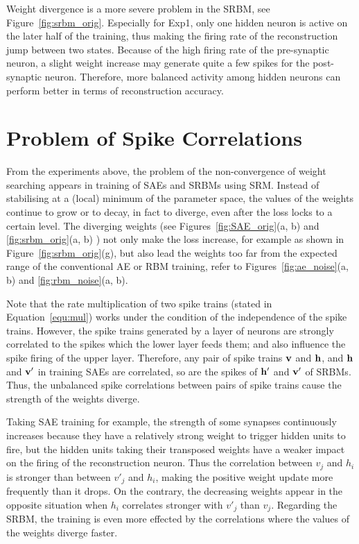 Weight divergence is a more severe problem in the SRBM, see Figure~\ref{fig:srbm_orig}.
Especially for Exp1, only one hidden neuron is active on the later half of the training, thus making the firing rate of the reconstruction jump between two states.
Because of the high firing rate of the pre-synaptic neuron, a slight weight increase may generate quite a few spikes for the post-synaptic neuron.
Therefore, more balanced activity among hidden neurons can perform better in terms of reconstruction accuracy.

\section{Problem of Spike Correlations}
\label{sec:problem}
From the experiments above, the problem of the non-convergence of weight searching appears in training of SAEs and SRBMs using SRM.
Instead of stabilising at a (local) minimum of the parameter space, the values of the weights continue to grow or to decay, in fact to diverge, even after the loss locks to a certain level.
The diverging weights (see Figures~\ref{fig:SAE_orig}(a, b) and \ref{fig:srbm_orig}(a, b) ) not only make the loss increase, for example as shown in Figure~\ref{fig:srbm_orig}(g), but also lead the weights too far from the expected range of the conventional AE or RBM training, refer to Figures~\ref{fig:ae_noise}(a, b) and \ref{fig:rbm_noise}(a, b).


Note that the rate multiplication of two spike trains (stated in Equation~\ref{equ:mul}) works under the condition of the independence of the spike trains.
However, the spike trains generated by a layer of neurons are strongly correlated to the spikes which the lower layer feeds them; and also influence the spike firing of the upper layer.
Therefore, any pair of spike trains $\bf{v}$ and $\bf{h}$, and $\bf{h}$ and $\bf{v'}$ in training SAEs are correlated, so are the spikes of $\bf{h'}$ and $\bf{v'}$ of SRBMs.
Thus, the unbalanced spike correlations between pairs of spike trains cause the strength of the weights diverge.


Taking SAE training for example, the strength of some synapses continuously increases because they have a relatively strong weight to trigger hidden units to fire, but the hidden units taking their transposed weights have a weaker impact on the firing of the reconstruction neuron.
Thus the correlation between $v_j$ and $h_i$ is stronger than between $v'_j$ and $h_i$, making the positive weight update more frequently than it drops.
On the contrary, the decreasing weights appear in the opposite situation when $h_i$ correlates stronger with $v'_j$ than $v_j$.
Regarding the SRBM, the training is even more effected by the correlations where the values of the weights diverge faster.
 

